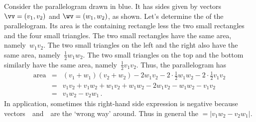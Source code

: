 \begin{wrapfigure}{r}{0pt} 
\end{wrapfigure}
Consider the parallelogram drawn in blue.
It has sides given by vectors \(\vv=(v_1,v_2)\) and \(\wv=(w_1,w_2)\), as shown.
Let's determine the  of the parallelogram. 
Its area is the containing rectangle less the two small rectangles and the four small triangles.
The two small rectangles have the same area, namely~\(w_1v_2\).
The two small triangles on the left and the right also have the same area, namely~\(\frac12w_1w_2\).
The two small triangles on the top and the bottom similarly have the same area, namely~\(\frac12v_1v_2\).
Thus, the parallelogram has 
\begin{eqnarray*}
\text{area}&=&(v_1+w_1)(v_2+w_2)-2w_1v_2-2\cdot\frac12w_1w_2-2\cdot\frac12v_1v_2
\nonumber
\\&=&v_1v_2+v_1w_2+w_1v_2+w_1w_2-2w_1v_2-w_1w_2-v_1v_2
\nonumber
\\&=&v_1w_2-v_2w_1\,. %
\end{eqnarray*}
In application, sometimes this right-hand side expression is negative because vectors~\vv\ and~\wv\ are the `wrong way' around.
Thus in general the \({}=|v_1w_2-v_2w_1|\).


